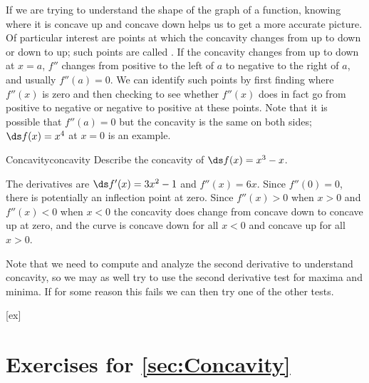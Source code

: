 If we are trying to understand the shape of the graph of a function,
knowing where it is concave up and concave down helps us to get a more
accurate picture. Of particular interest are points at which the
concavity changes from up to down or down to up; such points are
called . If the
concavity changes from up to down at $x=a$, $f''$ changes from
positive to the left of $a$ to negative to the right of $a$, and
usually $f''(a)=0$. We can identify such points by first finding where
$f''(x)$ is zero and then checking to see whether $f''(x)$ does in
fact go from positive to negative or negative to positive at these
points. Note that it is possible that $f''(a)=0$ but the concavity is
the same on both sides; $\ds f(x)=x^4$ at $x=0$ is an example.

\begin{example}{Concavity}{concavity}
Describe the concavity of $\ds f(x)=x^3-x$.
\end{example}
\begin{solution}
The derivatives are $\ds f'(x)=3x^2-1$ and $f''(x)=6x$.
Since $f''(0)=0$, there is potentially an inflection point at
zero. Since $f''(x)>0$ when $x>0$ and $f''(x)<0$ when $x<0$ the
concavity does change from concave down to concave up at zero, and the curve is
concave down for all $x<0$ and concave up for all $x>0$.
\end{solution}

Note that we need to compute and analyze the second derivative to
understand concavity, so we may as well try to use the second
derivative test for maxima and minima. If for some reason this fails
we can then try one of the other tests.


[ex]
\section*{Exercises for \ref{sec:Concavity}}

